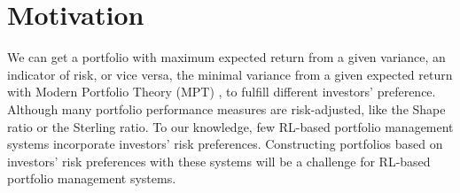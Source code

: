 \section {Motivation}
We can get a portfolio with maximum expected return from a given variance, an indicator of risk, or vice versa, the minimal variance from a given expected return with Modern Portfolio Theory (MPT) \cite{10.2307/2975974}, to fulfill different investors' preference.
Although many portfolio performance measures are risk-adjusted\cite{cogneau2009101}, like the Shape ratio\cite{Sharpe49} or the Sterling ratio\cite{magdon2004maximum}. To our knowledge, few RL-based portfolio management systems incorporate investors' risk preferences. Constructing portfolios based on investors' risk preferences with these systems will be a challenge for RL-based portfolio management systems.